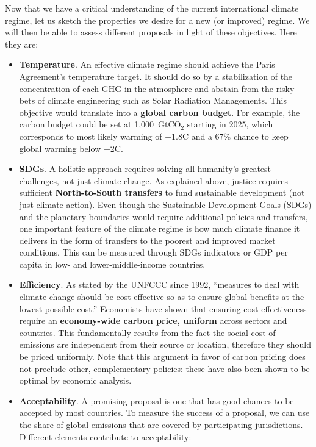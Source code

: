 \documentclass[12pt,english]{article}
\newcommand{\bo}[1]{\textbf{#1}}
\begin{document}
Now that we have a critical understanding of the current international climate regime, let us sketch the properties we desire for a new (or improved) regime. We will then be able to assess different proposals in light of these objectives. Here they are:
\begin{itemize}
  \item \bo{Temperature}. An effective climate regime should achieve the Paris Agreement's temperature target. It should do so by a stabilization of the concentration of each GHG in the atmosphere and abstain from the risky bets of climate engineering such as Solar Radiation Managements. This objective would translate into a \textbf{global carbon budget}. For example, the carbon budget could be set at 1,000~GtCO$_\text{2}$ starting in 2025, which corresponds to most likely warming of +1.8\textdegree{}C and a 67\% chance to keep global warming below +2\textdegree{}C. 
  \item \bo{SDGs}. A holistic approach requires solving all humanity's greatest challenges, not just climate change. As explained above, justice requires sufficient \textbf{North-to-South transfers} to fund sustainable development (not just climate action). Even though the Sustainable Development Goals (SDGs) and the planetary boundaries would require additional policies and transfers, one important feature of the climate regime is how much climate finance it delivers in the form of transfers to the poorest and improved market conditions. This can be measured through SDGs indicators or GDP per capita in low- and lower-middle-income countries.
  \item \bo{Efficiency}. As stated by the UNFCCC since 1992,\cite{unfccc_united_1992-1} ``measures to deal with climate change should be cost-effective so as to ensure global benefits at the lowest possible cost.'' Economists have shown that ensuring cost-effectiveness require an \textbf{economy-wide carbon price, uniform} across sectors and countries. This fundamentally results from the fact the social cost of emissions are independent from their source or location, therefore they should be priced uniformly. %
  Note that this argument in favor of carbon pricing does not preclude other, complementary policies: these have also been shown to be optimal by economic analysis.\cite{stiglitz_addressing_2019}
  \item \bo{Acceptability}. A promising proposal is one that has good chances to be accepted by most countries. To measure the success of a proposal, we can use the share of global emissions that are covered by participating jurisdictions. Different elements contribute to acceptability: 

\end{itemize}
\end{document}
